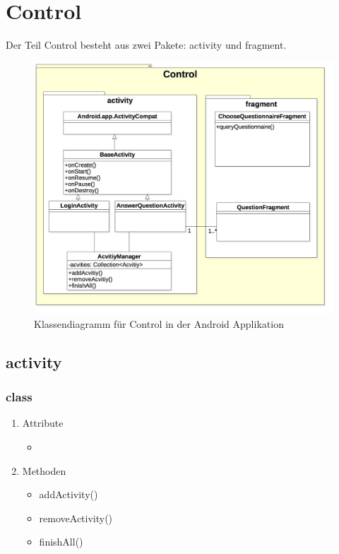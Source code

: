 \documentclass[a4paper]{scrreprt}
\begin{document}
        \section{Control}
            Der Teil Control besteht aus zwei Pakete: activity und fragment.

            \vspace*{1cm}
            \begin{figure}[H]
                \includegraphics[scale = 0.35]{Control.jpg}
                \caption{Klassendiagramm für Control in der Android Applikation }
            \end{figure}

            \subsection{activity}

                \subsubsection{class }
                \begin{enumerate}
                \item Attribute
                     \begin{itemize}
                            \item {}
                     \end{itemize}
                \item Methoden
                     \begin{itemize}
                                \item addActivity()
                                \item removeActivity()
                                \item finishAll()
                     \end{itemize}
                \end{enumerate}
\end{document}
